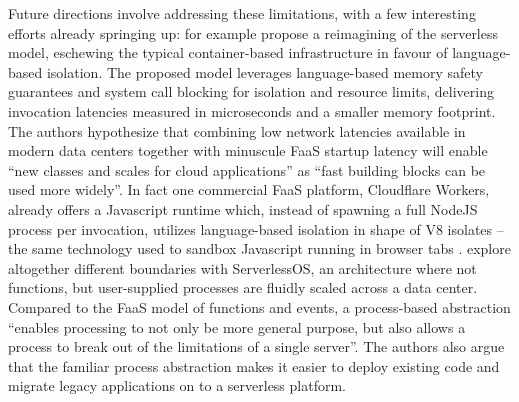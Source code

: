 Future directions involve addressing these limitations, with a few interesting efforts already springing up: \textcite{boucher18puttingmicroback} for example propose a reimagining of the serverless model, eschewing the typical container-based infrastructure in favour of language-based isolation. The proposed model leverages language-based memory safety guarantees and system call blocking for isolation and resource limits, delivering invocation latencies measured in microseconds and a smaller memory footprint. The authors hypothesize that combining low network latencies available in modern data centers together with minuscule FaaS startup latency will enable ``new classes and scales for cloud applications'' as ``fast building blocks can be used more widely''. In fact one commercial FaaS platform, Cloudflare Workers, already offers a Javascript runtime which, instead of spawning a full NodeJS process per invocation, utilizes language-based isolation in shape of V8 isolates -- the same technology used to sandbox Javascript running in browser tabs \parencite{cloudflareWorkers18}. \textcite{alali18moreServerless} explore altogether different boundaries with ServerlessOS, an architecture where not functions, but user-supplied processes are fluidly scaled across a data center. Compared to the FaaS model of functions and events, a process-based abstraction ``enables processing to not only be more general purpose, but also allows a process to break out of the limitations of a single server''. The authors also argue that the familiar process abstraction makes it easier to deploy existing code and migrate legacy applications on to a serverless platform.
